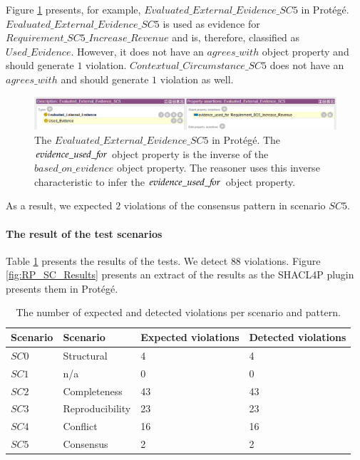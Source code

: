 Figure \ref{fig:05_RP_SC5_Evaluated_External_Evidence_SC5} presents, for example, $Evaluated\_External\_Evidence\_SC5$ in Prot\'eg\'e. $Evaluated\_External\_Evidence\_SC5$ is used as evidence for $Requirement\_SC5\_Increase\_Revenue$ and is, therefore, classified as $Used\_Evidence$. However, it does not have an $agrees\_with$ object property and should generate $1$ violation. $Contextual\_Circumstance\_SC5$ does not have an $agrees\_with$ and should generate $1$ violation as well.

\begin{figure}[H]
\centering
  \includegraphics[width=17cm]{../../Images/05_Validation/05_RP_SC5_Evaluated_External_Evidence_SC5.png}
  \caption{The $Evaluated\_External\_Evidence\_SC5$ in Prot\'eg\'e. The $evidence\_used\_{\mkern-2mu f\mkern-3mu}or$ object property is the inverse of the $based\_on\_evidence$ object property. The reasoner uses this inverse characteristic to infer the $evidence\_used\_{\mkern-2mu f\mkern-3mu}or$ object property.}
  \label{fig:05_RP_SC5_Evaluated_External_Evidence_SC5}
\end{figure}

As a result, we expected $2$ violations of the consensus pattern in scenario $SC5$.

\paragraph{The result of the test scenarios}
Table \ref{table:rp_number_of_violations} presents the results of the tests. We detect $88$ violations. Figure \ref{fig:RP_SC_Results} presents an extract of the results as the SHACL4P plugin presents them in Prot\'eg\'e.

\begin{table}[H]
\centering
\caption{The number of expected and detected violations per scenario and pattern.}
\begin{tabular}{| p{3cm} | p{3cm} | p{4cm} | p{4cm} | }
\hline
\rowcolor{document}
\color{documentText}Scenario & \color{documentText}Scenario & \color{documentText}Expected violations & \color{documentText}Detected violations  \\
\hline
$SC0$ & Structural & 4 & 4 \\
\hdashline
$SC1$ & n/a & 0 & 0 \\
\hdashline
$SC2$ & Completeness & 43 & 43 \\
\hdashline
$SC3$ & Reproducibility & 23 & 23 \\
\hdashline
$SC4$ & Conflict & 16 & 16 \\
\hdashline
$SC5$ & Consensus & 2 & 2 \\
\hline
\end{tabular}
\label{table:rp_number_of_violations}
\end{table}

